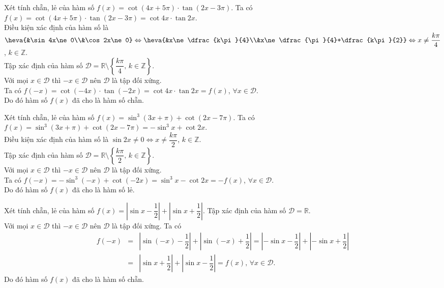 \begin{bt}%
	Xét tính chẵn, lẻ của hàm số $f(x)=\cot(4x+5\pi)\cdot\tan(2x-3\pi)$.
	\loigiai
	{
		Ta có $f(x)=\cot(4x+5\pi)\cdot\tan(2x-3\pi)=\cot 4x\cdot\tan 2x$.\\
		Điều kiện xác định của hàm số là $\heva{&\sin 4x\ne0\\&\cos 2x\ne0}\Leftrightarrow\heva{&x\ne\dfrac{k\pi}{4}\\&x\ne\dfrac{\pi}{4}+\dfrac{k\pi}{2}}\Leftrightarrow x\ne\dfrac{k\pi}{4}$, $k\in\mathbb{Z}$.\\
		Tập xác định của hàm số $\mathscr{D}=\mathbb{R}\setminus\left\{\dfrac{k\pi}{4},\,k\in\mathbb{Z}\right\}$.\\
		Với mọi $x\in\mathscr{D}$ thì $-x\in\mathscr{D}$ nên $\mathscr{D}$ là tập đối xứng.\\
		Ta có $f(-x)=\cot(-4x)\cdot\tan(-2x)=\cot 4x\cdot\tan 2x=f(x)$, $\forall x\in\mathscr{D}$.\\
		Do đó hàm số $f(x)$ đã cho là hàm số chẵn.
	}
\end{bt}
\begin{bt}%
	Xét tính chẵn, lẻ của hàm số $f(x)=\sin^3(3x+\pi)+\cot(2x-7\pi)$.
	\loigiai
	{
		Ta có $f(x)=\sin^3(3x+\pi)+\cot(2x-7\pi)=-\sin^3 x+\cot 2x$.\\
		Điều kiện xác định của hàm số là $\sin 2x\ne0\Leftrightarrow x\ne\dfrac{k\pi}{2}$, $k\in\mathbb{Z}$.\\
		Tập xác định của hàm số $\mathscr{D}=\mathbb{R}\setminus\left\{\dfrac{k\pi}{2},\,k\in\mathbb{Z}\right\}$.\\
		Với mọi $x\in\mathscr{D}$ thì $-x\in\mathscr{D}$ nên $\mathscr{D}$ là tập đối xứng.\\
		Ta có $f(-x)=-\sin^3(-x)+\cot(-2x)=\sin^3 x-\cot 2x=-f(x)$, $\forall x\in\mathscr{D}$.\\
		Do đó hàm số $f(x)$ đã cho là hàm số lẻ.
	}
\end{bt}
\begin{bt}%
	Xét tính chẵn, lẻ của hàm số $f(x)=\left|\sin x-\dfrac{1}{2}\right|+\left|\sin x+\dfrac{1}{2}\right|$.
	\loigiai
	{
		Tập xác định của hàm số $\mathscr{D}=\mathbb{R}$.\\
		Với mọi $x\in\mathscr{D}$ thì $-x\in\mathscr{D}$ nên $\mathscr{D}$ là tập đối xứng. Ta có
		\allowdisplaybreaks
		\begin{eqnarray*}
			f(-x)&=&\left|\sin (-x)-\dfrac{1}{2}\right|+\left|\sin (-x)+\dfrac{1}{2}\right|=\left|-\sin x-\dfrac{1}{2}\right|+\left|-\sin x+\dfrac{1}{2}\right|\\
			&=&\left|\sin x+\dfrac{1}{2}\right|+\left|\sin x-\dfrac{1}{2}\right|=f(x),\,\forall x\in\mathscr{D}.
		\end{eqnarray*}
		Do đó hàm số $f(x)$ đã cho là hàm số chẵn.
	}
\end{bt}
